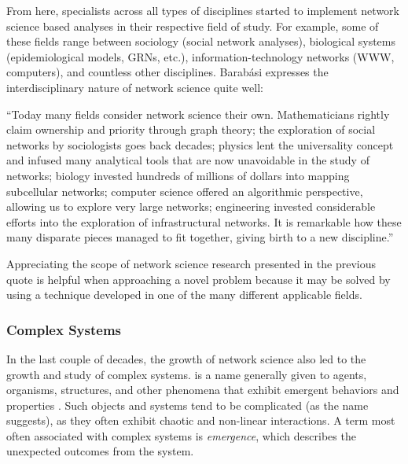From here, specialists across all types of disciplines started to implement network science based analyses in their respective field of study. For example, some of these fields range between sociology (social network analyses), biological systems (epidemiological models, \acrfull{GRNs}, etc.), information-technology networks (\acrfull{WWW}, computers), and countless other disciplines. Barab\'{a}si expresses the interdisciplinary nature of network science quite well:

\begin{displayquote}
``Today many fields consider network science their own. Mathematicians rightly claim ownership and priority through graph theory; the exploration of social networks by sociologists goes back decades; physics lent the universality concept and infused many analytical tools that are now unavoidable in the study of networks; biology invested hundreds of millions of dollars into mapping subcellular networks; computer science offered an algorithmic perspective, allowing us to explore very large networks; engineering invested considerable efforts into the exploration of infrastructural networks. It is remarkable how these many disparate pieces managed to fit together, giving birth to a new discipline.''

\end{displayquote}
Appreciating the scope of network science research presented in the previous quote is helpful when approaching a novel problem because it may be solved by using a technique developed in one of the many different applicable fields. 

\subsubsection{Complex Systems}\label{intro-complex-sys}
In the last couple of decades, the growth of network science also led to the growth and study of complex systems.  is a name generally given to agents, organisms, structures, and other phenomena that exhibit emergent behaviors and properties \citep{Foote2007}. Such objects and systems tend to be complicated (as the name suggests), as they often exhibit chaotic and non-linear interactions. A term most often associated with complex systems is \textit{emergence}, which describes the unexpected outcomes from the system. 

